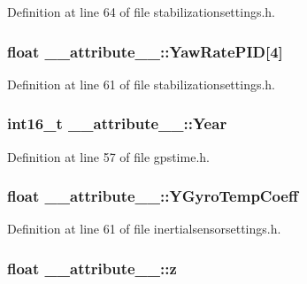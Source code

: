 \-Definition at line 64 of file stabilizationsettings.\-h.

\hypertarget{struct____attribute_____a86e2aa908b8b9ccaa7748a6033da2a67}{
\subsubsection[{\-Yaw\-Rate\-P\-I\-D}]{\setlength{\rightskip}{0pt plus 5cm}float {\bf \-\_\-\-\_\-attribute\-\_\-\-\_\-\-::\-Yaw\-Rate\-P\-I\-D}\mbox{[}4\mbox{]}}}\label{struct____attribute_____a86e2aa908b8b9ccaa7748a6033da2a67}


\-Definition at line 61 of file stabilizationsettings.\-h.

\hypertarget{struct____attribute_____a961fe0c9276282fc2d3ffdf8fa6e5d77}{
\subsubsection[{\-Year}]{\setlength{\rightskip}{0pt plus 5cm}int16\-\_\-t {\bf \-\_\-\-\_\-attribute\-\_\-\-\_\-\-::\-Year}}}\label{struct____attribute_____a961fe0c9276282fc2d3ffdf8fa6e5d77}


\-Definition at line 57 of file gpstime.\-h.

\hypertarget{struct____attribute_____a91783a73474e754c12caec1eee4b372d}{
\subsubsection[{\-Y\-Gyro\-Temp\-Coeff}]{\setlength{\rightskip}{0pt plus 5cm}float {\bf \-\_\-\-\_\-attribute\-\_\-\-\_\-\-::\-Y\-Gyro\-Temp\-Coeff}}}\label{struct____attribute_____a91783a73474e754c12caec1eee4b372d}


\-Definition at line 61 of file inertialsensorsettings.\-h.

\hypertarget{struct____attribute_____a6f35aeb7dca68894b6f64cdad1a4bdd2}{
\subsubsection[{z}]{\setlength{\rightskip}{0pt plus 5cm}float {\bf \-\_\-\-\_\-attribute\-\_\-\-\_\-\-::z}}}\label{struct____attribute_____a6f35aeb7dca68894b6f64cdad1a4bdd2}



